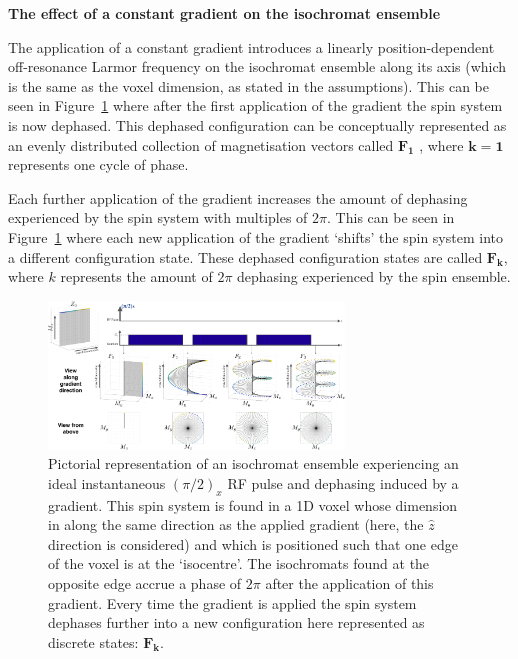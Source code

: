 \textbf{The effect of a constant gradient on the isochromat ensemble} 

The application of a constant gradient introduces a linearly position-dependent off-resonance Larmor frequency on the isochromat ensemble along its axis (which is the same as the voxel dimension, as stated in the assumptions).
This can be seen in Figure~\ref{fig:effectOfGradsEPG} where after the first application of the gradient the spin system is now dephased.
This dephased configuration can be conceptually represented as an evenly distributed collection of magnetisation vectors called $\bm{F_1}$ \cite{Hennig1988} \cite{Scheffler1999}, where $\bm{k=1}$ represents one cycle of phase.

\hfill

Each further application of the gradient increases the amount of dephasing experienced by the spin system with multiples of $2\pi$.
This can be seen in Figure~\ref{fig:effectOfGradsEPG} where each new application of the gradient `shifts' the spin system into a different configuration state.
These dephased configuration states are called $\bm{F_k}$, where $k$ represents the amount of $2\pi$ dephasing experienced by the spin ensemble.

\begin{figure}[H]
    \centering
    \includegraphics[angle=90,width=0.7\textwidth, keepaspectratio]{images/mrf/effectOfGradsEPG}
    \caption{Pictorial representation of an isochromat ensemble experiencing an ideal instantaneous $(\pi/2)_x$ RF pulse and dephasing induced by a gradient.
    This spin system is found in a 1D voxel whose dimension in along the same direction as the applied gradient (here, the $\hat{z}$ direction is considered) and which is positioned such that one edge of the voxel is at the `isocentre'. The isochromats found at the opposite edge accrue a phase of $2\pi$ after the application of this gradient.
    Every time the gradient is applied the spin system dephases further into a new configuration here represented as discrete states: $\bm{F_k}$.}
    \label{fig:effectOfGradsEPG}
\end{figure}

